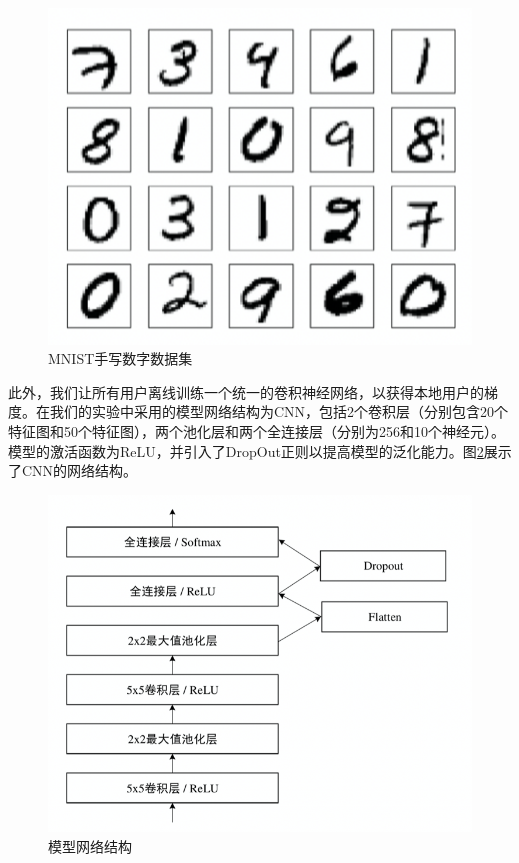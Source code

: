 \begin{figure}[!hbt]
\centering
	\includegraphics[scale=0.6]{fig2/C3/MNIST}%
	\caption{MNIST手写数字数据集}
	\label{fig:MNIST手写数字数据集}	
\end{figure}

此外，我们让所有用户离线训练一个统一的卷积神经网络，以获得本地用户的梯度。在我们的实验中采用的模型网络结构为CNN，包括2个卷积层（分别包含20个特征图和50个特征图），两个池化层和两个全连接层（分别为256和10个神经元）。模型的激活函数为ReLU，并引入了DropOut正则以提高模型的泛化能力。图\ref{fig:CNN模型网络结构}展示了CNN的网络结构。

\begin{figure}[!hbt]
\centering
	\includegraphics[scale=0.6]{fig2/C3/CNN网络结构}%
	\caption{模型网络结构}
	\label{fig:CNN模型网络结构}	
\end{figure}

